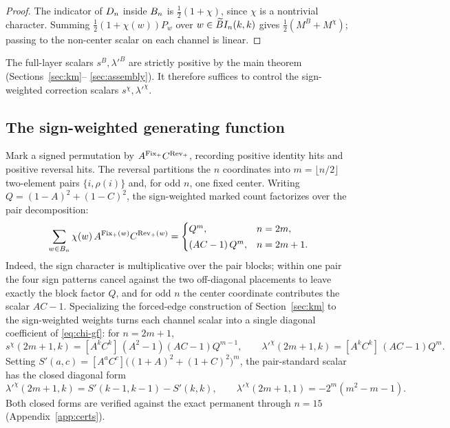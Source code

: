 \begin{proof}
The indicator of $D_n$ inside $B_n$ is $\tfrac12(1+\chi)$, since $\chi$ is a nontrivial character.  Summing
$\tfrac12(1+\chi(w))P_w$ over $w\in\widetilde{B}I_n(k,k)$ gives $\tfrac12(M^{B}+M^{\chi})$; passing to the non-center
scalar on each channel is linear.
\end{proof}

The full-layer scalars $s^{B},\lambda'^{B}$ are strictly positive by the main theorem (Sections~\ref{sec:km}--%
\ref{sec:assembly}).  It therefore suffices to control the sign-weighted correction scalars $s^{\chi},\lambda'^{\chi}$.

\subsection{The sign-weighted generating function}

Mark a signed permutation by $A^{\operatorname{Fix}_+}C^{\operatorname{Rev}_+}$, recording positive identity hits and positive reversal hits.  The
reversal partitions the $n$ coordinates into $m=\lfloor n/2\rfloor$ two-element pairs $\{i,\rho(i)\}$ and, for odd
$n$, one fixed center.  Writing $Q=(1-A)^2+(1-C)^2$, the sign-weighted marked count factorizes over the pair
decomposition:
\begin{equation}\label{eq:chi-gf}
  \sum_{w\in B_n}\chi(w)\,A^{\operatorname{Fix}_+(w)}C^{\operatorname{Rev}_+(w)}=
  \begin{cases}
    Q^{m}, & n=2m,\\[2pt]
    (AC-1)\,Q^{m}, & n=2m+1.
  \end{cases}
\end{equation}
Indeed, the sign character is multiplicative over the pair blocks; within one pair the four sign patterns cancel
against the two off-diagonal placements to leave exactly the block factor $Q$, and for odd $n$ the center coordinate
contributes the scalar $AC-1$.  Specializing the forced-edge construction of Section~\ref{sec:km} to the sign-weighted
weights turns each channel scalar into a single diagonal coefficient of \eqref{eq:chi-gf}: for $n=2m+1$,
\begin{equation}\label{eq:chi-scalars}
  s^{\chi}(2m+1,k)=[A^kC^k]\,(A^2-1)(AC-1)Q^{m-1},
  \qquad
  \lambda'^{\chi}(2m+1,k)=[A^kC^k]\,(AC-1)Q^{m}.
\end{equation}
Setting $S'(a,c)=[A^aC^c]\bigl((1+A)^2+(1+C)^2\bigr)^{m}$, the pair-standard scalar has the closed diagonal form
\begin{equation}\label{eq:lamchi-closed}
  \lambda'^{\chi}(2m+1,k)=S'(k-1,k-1)-S'(k,k),
  \qquad
  \lambda'^{\chi}(2m+1,1)=-2^{m}(m^2-m-1).
\end{equation}
Both closed forms are verified against the exact permanent through $n=15$ (Appendix~\ref{app:certs}).

